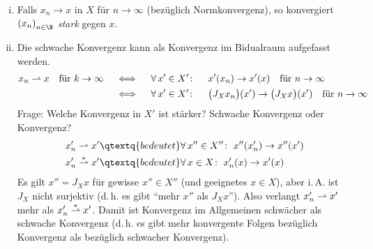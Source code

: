 \nnBemerkung
\begin{enumerate}[(i)]
    \item
        Falls $x_n\to x$ in $X$ für $n\to\infty$ (bezüglich Normkonvergenz), so
        konvergiert $\nSeq x$ \emph{stark} gegen $x$.
        
    \item
        Die schwache Konvergenz kann als \schwachstern Konvergenz im Bidualraum
        aufgefasst werden.
        \begin{align*}
            x_n\weakto x \fuer[\quad] k\to\infty
            \quad&\iff\quad \forall\,x'\in X'\colon\quad\;
                x'(x_n)\to x'(x) \fuer[\quad] n\to\infty
            \\
            &\iff\quad \forall\,x'\in X'\colon\quad\;
                \bigl( J_Xx_n \bigr)(x') \to
                \bigl( J_X x \bigr)(x') \fuer[\quad] n\to\infty
        \end{align*}
        Frage: Welche Konvergenz in $X'$ ist stärker? Schwache Konvergenz oder
        \schwachstern Konvergenz?
        \begin{align*}
            x_n' \weakto x' &\qtextq{bedeutet}
            \forall\,x''\in X''\colon\; x''(x_n') \to x''(x')
            \\
            x_n' \weakstarto x' &\qtextq{bedeutet}
            \forall\,x\in X\colon\; x_n'(x) \to x'(x)
        \end{align*}
        Es gilt $x'' = J_X x$ für gewisse $x''\in X''$ (und geeignetes 
        $x\in X$), aber i.\,A. ist $J_X$ nicht surjektiv (d.\,h. es gibt
        \enquote{mehr $x''$ als $J_Xx$}). Also verlangt $x_n'
        \weakto x'$ mehr als $x_n'\weakstarto x'$. Damit
        ist \schwachstern Konvergenz im Allgemeinen schwächer als schwache
        Konvergenz (d.\,h. es gibt mehr konvergente Folgen bezüglich \schwachstern
        Konvergenz als bezüglich schwacher Konvergenz).
\end{enumerate}

